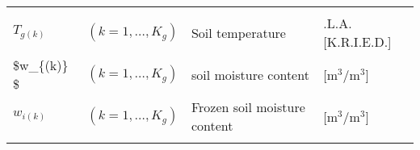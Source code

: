 \begin{longtable}[]{@{}llll@{}}
\begin{minipage}[t]{0.22\columnwidth}
\strut
\end{minipage}\tabularnewline
\begin{minipage}[t]{0.22\columnwidth}\raggedright
\(T_{g(k)}\)\strut
\end{minipage} & \begin{minipage}[t]{0.22\columnwidth}\raggedright
\((k=1,\ldots,K_g)\)\strut
\end{minipage} & \begin{minipage}[t]{0.22\columnwidth}\raggedright
Soil temperature\strut
\end{minipage} & \begin{minipage}[t]{0.22\columnwidth}\raggedright
\K.L.A.{[}K.R.I.E.D.{]}\strut
\end{minipage}\tabularnewline
\begin{minipage}[t]{0.22\columnwidth}\raggedright
\$w\_\{(k)\} \$\strut
\end{minipage} & \begin{minipage}[t]{0.22\columnwidth}\raggedright
\((k=1,\ldots,K_g)\)\strut
\end{minipage} & \begin{minipage}[t]{0.22\columnwidth}\raggedright
soil moisture content\strut
\end{minipage} & \begin{minipage}[t]{0.22\columnwidth}\raggedright
{[}m\(^3\)/m\(^3\){]}\strut
\end{minipage}\tabularnewline
\begin{minipage}[t]{0.22\columnwidth}\raggedright
\(w_{i(k)}\)\strut
\end{minipage} & \begin{minipage}[t]{0.22\columnwidth}\raggedright
\((k=1,\ldots,K_g)\)\strut
\end{minipage} & \begin{minipage}[t]{0.22\columnwidth}\raggedright
Frozen soil moisture content\strut
\end{minipage} & \begin{minipage}[t]{0.22\columnwidth}\raggedright
{[}m\(^3\)/m\(^3\){]}\strut
\end{minipage}\tabularnewline
\begin{minipage}[t]{0.22\columnwidth}\raggedright
\strut
\end{minipage} & \begin{minipage}[t]{0.22\columnwidth}\raggedright
\strut
\end{minipage} & \begin{minipage}[t]{0.22\columnwidth}\raggedright
\strut
\end{minipage} & \begin{minipage}[t]{0.22\columnwidth}\raggedright

\end{minipage}
\end{longtable}
